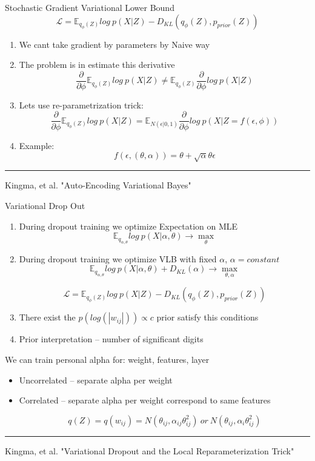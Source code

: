 \documentclass{beamer}
\begin{document}
\begin{frame}{Stochastic Gradient Variational Lower Bound}	
	$$\mathcal{L} = \mathds{E}_{q_\phi(Z)} log~p(X|Z) - D_{KL}(q_\phi(Z), p_{prior}(Z))$$
	
	\begin{enumerate}
		\item We cant take gradient by parameters by Naive way
		\item The problem is in estimate this derivative 
			$$\frac{\partial}{\partial \phi}\mathds{E}_{q_\phi(Z)} log~p(X|Z) \neq \mathds{E}_{q_\phi(Z)} \frac{\partial}{\partial \phi} log~p(X|Z)$$
		\item Lets use  re-parametrization trick:
		$$\frac{\partial}{\partial \phi}\mathds{E}_{q_\phi(Z)} log~p(X|Z) = \mathds{E}_{N(\epsilon|0, 1)} \frac{\partial}{\partial \phi} log~p(X|Z=f(\epsilon, \phi))$$
		\item Example:
		$$f(\epsilon, (\theta, \alpha)) = \theta + \sqrt{\alpha}\theta\epsilon$$
	\end{enumerate}
	
	\noindent\rule{12cm}{0.4pt}
	\footnotesize{ Kingma, et al. "Auto-Encoding Variational Bayes" }
\end{frame}

\begin{frame}{Variational Drop Out}	
	\begin{enumerate}
		 \item During dropout training we optimize Expectation on MLE
			$$\mathds{E}_{q_{\alpha, \theta}}log~p(X| \alpha, \theta) \rightarrow \max_\theta$$
		\vspace{-0.5cm}
		 \item During dropout training we optimize VLB with fixed $\alpha$, $\alpha=constant$
		 $$\mathds{E}_{q_{\alpha, \theta}}log~p(X| \alpha, \theta) + D_{KL}(\alpha) \rightarrow \max_{\theta, \alpha}$$ 
		
		\vspace{-0.5cm}
		 $$\mathcal{L} = \mathds{E}_{q_\phi(Z)} log~p(X|Z) - D_{KL}(q_\phi(Z), p_{prior}(Z))$$
		
		
		 \item There exist the $p(log(|w_{ij}|)) \propto c$ prior satisfy this conditions  
		 \item Prior interpretation -- number of significant digits
	\end{enumerate}
	
	\vspace{0.2cm}
	 We can train personal alpha for: weight, features, layer
	\begin{itemize}
		 \item Uncorrelated -- separate alpha per weight
		 \item Correlated  -- separate alpha per weight correspond to same features
		
			$$q(Z) = q(w_{ij}) = N(\theta_{ij}, \alpha_{ij}\theta_{ij}^2)~or~N(\theta_{ij}, \alpha_{i}\theta_{ij}^2)$$
	\end{itemize}
	
	\noindent\rule{12cm}{0.4pt}
	\footnotesize{ Kingma, et al. "Variational Dropout and the Local Reparameterization Trick" }
\end{frame}
\end{document}

